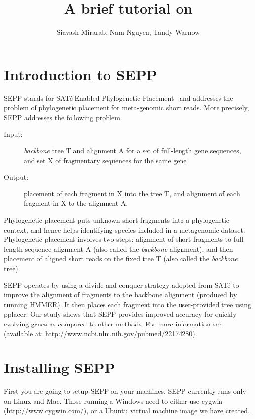 \documentclass[11pt]{article} %
\title{A brief tutorial on \sepp }
\author{Siavash Mirarab, Nam Nguyen, Tandy Warnow}
\newcommand{\sepp}{SEPP\xspace}
\newcommand{\sate}{SAT\'{e}\xspace}
\newcommand{\pplacer}{pplacer\xspace}
\newcommand{\hmmer}{HMMER\xspace}
\begin{document}
\maketitle
\tableofcontents
\section{Introduction to \sepp}
\sepp stands for \sate-Enabled Phylogenetic Placement~\cite{sepp} and addresses the problem of phylogenetic placement for meta-genomic short reads. More precisely, \sepp addresses the following problem.

\begin{description}
\item [Input:] {\em backbone} tree T and alignment A for a set of full-length gene sequences, and set X of fragmentary sequences for the same gene

\item [Output:] placement of each fragment in X into the tree T, and alignment of each fragment in X to the alignment A.

\end{description}

Phylogenetic placement puts unknown short fragments into a phylogenetic context, and hence helps identifying species included in a metagenomic dataset.  
Phylogenetic placement involves two steps: alignment of short fragments to full length sequence alignment A (also called the {\em backbone} alignment), and then placement of aligned short reads on the fixed tree T (also called the {\em backbone} tree). 

\sepp operates by using a divide-and-conquer strategy adopted from \sate \cite{liu09science,sate2} to improve the alignment of fragments to the
backbone alignment (produced by running \hmmer \cite{hmmer}). 
It then places each fragment into the user-provided tree using \pplacer \cite{pplacer}. 
Our study shows that \sepp provides improved accuracy for quickly evolving genes as compared to other methods. For more information see \cite{sepp} (available at: \url{http://www.ncbi.nlm.nih.gov/pubmed/22174280}).

\section{Installing \sepp}
First you are going to setup \sepp on your machines. \sepp currently runs only on Linux and Mac. Those running a Windows need to either use cygwin (\url{http://www.cygwin.com/}), or a Ubuntu virtual machine image we have created. 
 
\end{document}
